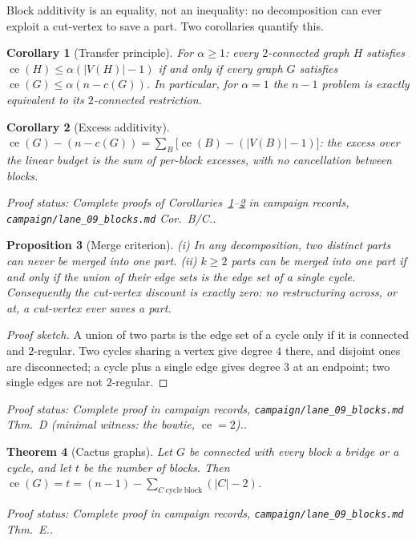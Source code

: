 \documentclass[a4paper,11pt]{amsart}
\newtheorem{theorem}{Theorem}[section]
\newtheorem{corollary}[theorem]{Corollary}
\newtheorem{proposition}[theorem]{Proposition}
\theoremstyle{definition}
\theoremstyle{remark}
\newcommand{\ce}{\operatorname{ce}}
\newcommand{\proofsrc}[1]{\par\smallskip\noindent\begin{sloppypar}\small\emph{Proof status: #1.}\end{sloppypar}\par\smallskip}
\begin{document}
Block additivity is an equality, not an inequality: no decomposition can ever exploit a cut-vertex to save
a part. Two corollaries quantify this.

\begin{corollary}[Transfer principle]\label{cor:transfer}
For $\alpha\ge1$: every $2$-connected graph $H$ satisfies $\ce(H)\le\alpha(|V(H)|-1)$ \emph{if and only if}
every graph $G$ satisfies $\ce(G)\le\alpha(n-c(G))$. In particular, for $\alpha=1$ the $n-1$ problem is
exactly equivalent to its $2$-connected restriction.
\end{corollary}

\begin{corollary}[Excess additivity]\label{cor:excess}
$\ce(G)-(n-c(G))=\sum_{B}\bigl[\ce(B)-(|V(B)|-1)\bigr]$: the excess over the linear budget is the sum of
per-block excesses, with no cancellation between blocks.
\end{corollary}
\proofsrc{Complete proofs of Corollaries~\ref{cor:transfer}--\ref{cor:excess} in campaign records,
\texttt{campaign/lane\_09\_blocks.md} Cor.~B/C.}

\begin{proposition}[Merge criterion]\label{prop:merge}
(i) In any decomposition, two distinct parts can never be merged into one part. (ii) $k\ge2$ parts can be
merged into one part if and only if the union of their edge sets is the edge set of a single cycle.
Consequently the cut-vertex discount is exactly zero: no restructuring across, or at, a cut-vertex ever
saves a part.
\end{proposition}
\begin{proof}[Proof sketch]
A union of two parts is the edge set of a cycle only if it is connected and $2$-regular. Two cycles sharing
a vertex give degree $4$ there, and disjoint ones are disconnected; a cycle plus a single edge gives degree
$3$ at an endpoint; two single edges are not $2$-regular.
\end{proof}
\proofsrc{Complete proof in campaign records, \texttt{campaign/lane\_09\_blocks.md} Thm.~D (minimal
witness: the bowtie, $\ce=2$).}

\begin{theorem}[Cactus graphs]\label{thm:cactus}
Let $G$ be connected with every block a bridge or a cycle, and let $t$ be the number of blocks. Then
$\ce(G)=t=(n-1)-\sum_{C\ \mathrm{cycle\ block}}(|C|-2)$.
\end{theorem}
\proofsrc{Complete proof in campaign records, \texttt{campaign/lane\_09\_blocks.md} Thm.~E.}
\end{document}
